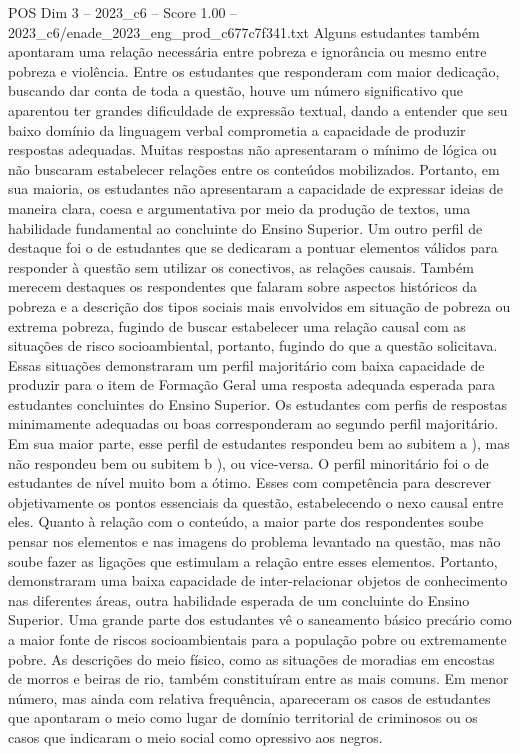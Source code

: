 \begin{textsample}{POS Dim 3 – 2023\_c6 – Score 1.00 – 2023\_c6/enade\_2023\_eng\_prod\_c677c7f341.txt}
Alguns estudantes também apontaram uma relação necessária entre pobreza e ignorância ou mesmo entre pobreza e violência.
Entre os estudantes que responderam com maior dedicação, buscando dar conta de toda a questão, houve um número significativo que aparentou ter grandes dificuldade de expressão textual, dando a entender que seu baixo domínio da linguagem verbal comprometia a capacidade de produzir respostas adequadas.
Muitas respostas não apresentaram o mínimo de lógica ou não buscaram estabelecer relações entre os conteúdos mobilizados.
Portanto, em sua maioria, os estudantes não apresentaram a capacidade de expressar ideias de maneira clara, coesa e argumentativa por meio da produção de textos, uma habilidade fundamental ao concluinte do Ensino Superior.
Um outro perfil de destaque foi o de estudantes que se dedicaram a pontuar elementos válidos para responder à questão sem utilizar os conectivos, as relações causais.
Também merecem destaques os respondentes que falaram sobre aspectos históricos da pobreza e a descrição dos tipos sociais mais envolvidos em situação de pobreza ou extrema pobreza, fugindo de buscar estabelecer uma relação causal com as situações de risco socioambiental, portanto, fugindo do que a questão solicitava.
Essas situações demonstraram um perfil majoritário com baixa capacidade de produzir para o item de Formação Geral uma resposta adequada esperada para estudantes concluintes do Ensino Superior.
Os estudantes com perfis de respostas minimamente adequadas ou boas corresponderam ao segundo perfil majoritário.
Em sua maior parte, esse perfil de estudantes respondeu bem ao subitem a ), mas não respondeu bem ou subitem b ), ou vice-versa.
O perfil minoritário foi o de estudantes de nível muito bom a ótimo.
Esses com competência para descrever objetivamente os pontos essenciais da questão, estabelecendo o nexo causal entre eles.
Quanto à relação com o conteúdo, a maior parte dos respondentes soube pensar nos elementos e nas imagens do problema levantado na questão, mas não soube fazer as ligações que estimulam a relação entre esses elementos.
Portanto, demonstraram uma baixa capacidade de inter-relacionar objetos de conhecimento nas diferentes áreas, outra habilidade esperada de um concluinte do Ensino Superior.
Uma grande parte dos estudantes vê o saneamento básico precário como a maior fonte de riscos socioambientais para a população pobre ou extremamente pobre.
As descrições do meio físico, como as situações de moradias em encostas de morros e beiras de rio, também constituíram entre as mais comuns.
Em menor número, mas ainda com relativa frequência, apareceram os casos de estudantes que apontaram o meio como lugar de domínio territorial de criminosos ou os casos que indicaram o meio social como opressivo aos negros.

\end{textsample}
